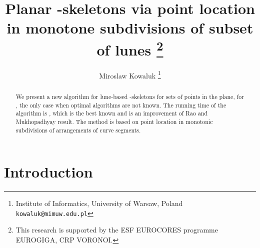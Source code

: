 \documentclass[10pt]{article}
\title{Planar -skeletons via point location in monotone subdivisions
of subset of lunes
\thanks{This research is supported by the ESF EUROCORES programme EUROGIGA, CRP VORONOI.}}
\author{
        Miroslaw Kowaluk 
        \thanks{Institute of Informatics, University of Warsaw, Poland {\tt kowaluk@mimuw.edu.pl}}
}
\begin{document}
\maketitle

\begin{abstract}
We present a  new algorithm for lune-based -skeletons for sets of  points in the plane,
for  ,  the only case when optimal algorithms are not known. 
The running time  of the algorithm is , which is the best known
and is an improvement of Rao and Mukhopadhyay \cite{rm97} result.
The method is based on point location in monotonic subdivisions of arrangements of curve segments. 
\end{abstract}

\section{Introduction}
\end{document}
